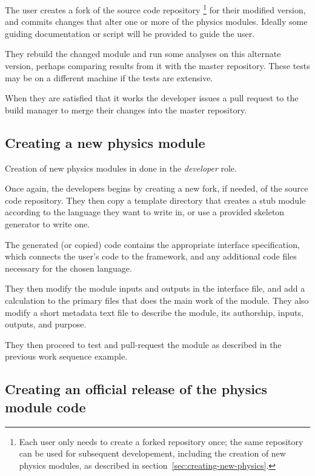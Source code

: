\documentclass[draftmode,draftwater]{memarticle}
\begin{document}
The user creates a fork of the source code repository%
\footnote{Each user only needs to create a forked repository once; the
  same repository can be used for subsequent developement, including the
  creation of new physics modules, as described in
  section~\ref{sec:creating-new-physics}.}
for their modified version,
and commits changes that alter one or more of the physics modules.
Ideally some guiding documentation or script will be provided to guide
the user.

They rebuild the changed module and run some analyses on this
alternate version, perhaps comparing results from it with the
master repository.  These tests may be on a different machine if the
tests are extensive.

When they are satisfied that it works the developer issues a pull
request to the build manager to merge their changes into the master
repository.

\subsection{Creating a new physics module\label{sec:creating-new-physics}}

Creation of new physics modules in done in the \emph{developer} role.

Once again, the developers begins by creating a new fork, if needed, of the source code
repository. They then copy a template directory
that creates a stub module according to the language they want to write
in, or use a provided skeleton generator to write one.

The generated (or copied) code contains the appropriate interface
specification,
which connects the user's code to the
framework, and any additional code files necessary for the chosen language.

They then modify the module inputs and outputs in the interface file,
and add a
calculation to the primary files that does the main work of the module.
They also modify a short metadata text file to describe the
module, its authorship, inputs, outputs, and purpose.

They then proceed to test and pull-request the module as described in the
previous work sequence example.

\subsection{Creating an official release of the physics module code}
\end{document}
